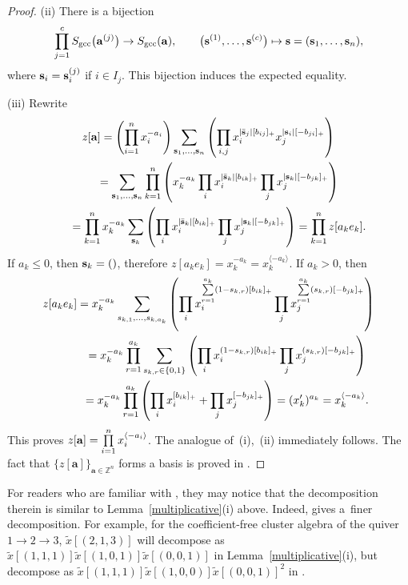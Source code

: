 \documentclass[pdftex]{sigma}
\numberwithin{equation}{section}
\begin{document}
\begin{proof}
(ii) There is a bijection
\begin{gather*}
\prod_{j=1}^c S_{\rm gcc}\big({\bf a}^{(j)}\big)\to S_{\rm gcc}({\bf a}), \qquad
\big({\bf s}^{(1)},\dots, {\bf s}^{(c)}\big)\mapsto {\bf s}=({\bf s}_1,\dots,{\bf s}_n),
\end{gather*}
where ${\bf s}_i={\bf s}^{(j)}_i$ if $i\in I_j$.
This bijection induces the expected equality.

(iii) Rewrite
\begin{gather*}
z[{\bf a}] =\left(\prod_{i=1}^n  x_i^{-a_i}\right)
\sum_{{\bf s}_1,\dots,{\bf s}_n}\left(\prod_{i,j}  x_{i}^{|\bar{\mathbf{s}}_j|[b_{ij}]_+} x_{j}^{|\mathbf{s}_i|[-b_{ji}]_+}\right)\\
\hphantom{z[{\bf a}]}{} =
\sum_{{\bf s}_1,\dots,{\bf s}_n}\prod_{k=1}^n
\left(x_k^{-a_k}\prod_{i}  x_{i}^{|\bar{\mathbf{s}}_k|[b_{ik}]_+}\prod_j x_{j}^{|\mathbf{s}_k|[-b_{jk}]_+}\right)\\
\hphantom{z[{\bf a}]}{}
=
\prod_{k=1}^n
x_k^{-a_k}\sum_{{\bf s}_k}
\left(\prod_{i}  x_{i}^{|\bar{\mathbf{s}}_k|[b_{ik}]_+}\prod_j x_{j}^{|\mathbf{s}_k|[-b_{jk}]_+}\right)=\prod_{k=1}^n z[a_ke_k].\\
\end{gather*}
If $a_k\le 0$, then ${\bf s}_k=()$, therefore $z[a_ke_k]=x_k^{-a_k}=x_k^{\langle -a_k\rangle}$. If $a_k> 0$, then
\begin{gather*}
z[a_ke_k]
 =
x_k^{-a_k}\sum_{s_{k,1},\dots,s_{k,a_k}}
\left(\prod_{i}  x_{i}^{\sum\limits_{r=1}^{a_k}(1-s_{k,r})[b_{ik}]_+}\prod_j x_{j}^{\sum\limits_{r=1}^{a_k}(s_{k,r})[-b_{jk}]_+}\right)\\
\hphantom{z[a_ke_k]}{}
 =
x_k^{-a_k}
\prod_{r=1}^{a_k}
\sum_{s_{k,r}\in\{0,1\}}
\left(\prod_{i}  x_{i}^{(1-s_{k,r})[b_{ik}]_+}\prod_j x_{j}^{(s_{k,r})[-b_{jk}]_+}\right)\\
\hphantom{z[a_ke_k]}{}  =
x_k^{-a_k}
\prod_{r=1}^{a_k}
\left(\prod_{i}  x_{i}^{[b_{ik}]_+}+\prod_j x_{j}^{[-b_{jk}]_+}\right)
=(x'_k)^{a_k}=x_k^{\langle -a_k\rangle}.
\end{gather*}
This proves $z[{\bf a}]=\prod\limits_{i=1}^nx_i^{\langle-a_i\rangle}$. The analogue of~(i),~(ii) immediately follows. The fact that $\{z[\mathbf{a}]\}_{\mathbf{a}\in\mathbb{Z}^n}$ forms a basis is proved in  \cite[Theorem~1.16]{BFZ}.
\end{proof}


\begin{Remark}
For readers who are familiar with \cite[Lemma~4.2]{B9}, they may notice that the decomposition therein is similar to Lemma~\ref{multiplicative}(i) above. Indeed, \cite[Lemma~4.2]{B9} gives a~f\/iner decomposition. For example, for the coef\/f\/icient-free cluster algebra of the quiver $1\to 2\to 3$, $\tilde{x}[(2,1,3)]$ will decompose as $\tilde{x}[(1,1,1)]\tilde{x}[(1,0,1)]\tilde{x}[(0,0,1)]$ in  Lemma~\ref{multiplicative}(i),  but decompose as $\tilde{x}[(1,1,1)]\tilde{x}[(1,0,0)]\tilde{x}[(0,0,1)]^2$ in \cite[Lemma~4.2]{B9}.
\end{Remark}
\end{document}
